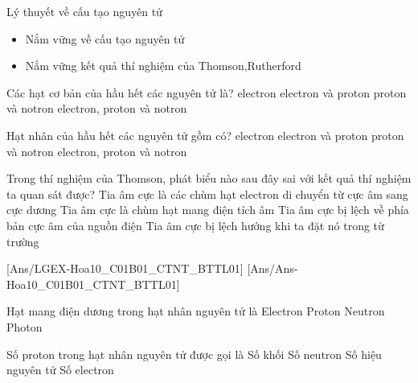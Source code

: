 \begin{dang}{Lý thuyết về cấu tạo nguyên tử}
	\begin{itemize}
		\item Nắm vững về cấu tạo nguyên tử
		\item Nắm vững kết quả thí nghiệm của Thomson,Rutherford
	\end{itemize}
\end{dang}
\begin{vdex}
	Các hạt cơ bản của hầu hết các nguyên tử là?
	\choice
	{electron}
	{electron và proton}
	{proton và notron}
	{\True electron, proton và notron}
	\loigiai{}
\end{vdex}
\begin{vdex}
	Hạt nhân của hầu hết các nguyên tử gồm có?
	\choice
	{electron}
	{electron và proton}
	{\True proton và notron}
	{electron, proton và notron}
	\loigiai{}
\end{vdex}
\begin{vdex}
	Trong thí nghiệm của Thomson, phát biểu nào sau đây sai với kết quả thí nghiệm ta quan sát được?
	\choice
	{Tia âm cực là các chùm hạt electron di chuyển từ cực âm sang cực dương}
	{Tia âm cực là chùm hạt mang điện tích âm}
	{\True	Tia âm cực bị lệch về phía bản cực âm của nguồn điện}
	{Tia âm cực bị lệch hướng khi ta đặt nó trong từ trường}
	\loigiai{}
\end{vdex}

[Ans/LGEX-Hoa10_C01B01_CTNT_BTTL01]
[Ans/Ans-Hoa10_C01B01_CTNT_BTTL01]
\begin{ex}%
	Hạt mang điện dương trong hạt nhân nguyên tử là
	\choice
	{Electron}
	{\True Proton}
	{Neutron}
	{Photon}
\end{ex}

\begin{ex}%
	Số proton trong hạt nhân nguyên tử được gọi là
	\choice
	{Số khối}
	{Số neutron}
	{\True Số hiệu nguyên tử}
	{Số electron}
\end{ex}

